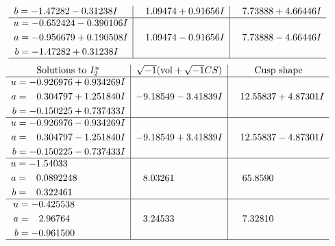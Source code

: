 \documentclass[1p]{elsarticle_modified}
\theoremstyle{definition}
\newcommand{\I}{\sqrt{-1}}
\begin{document}
$$\begin{array}{c|c|c}
\begin{aligned}
b &= -1.47282 - 0.31238 I\end{aligned}
 & \phantom{-}1.09474 + 0.91656 I & \phantom{-}7.73888 + 4.66446 I \\ \hline\begin{aligned}
u &= -0.652424 - 0.390106 I \\
a &= -0.956679 + 0.190508 I \\
b &= -1.47282 + 0.31238 I\end{aligned}
 & \phantom{-}1.09474 - 0.91656 I & \phantom{-}7.73888 - 4.66446 I\\
 \hline 
 \end{array}$$\newpage$$\begin{array}{c|c|c}  
\text{Solutions to }I^u_{2}& \I (\text{vol} + \sqrt{-1}CS) & \text{Cusp shape}\\
 \hline 
\begin{aligned}
u &= -0.926976 + 0.934269 I \\
a &= \phantom{-}0.304797 + 1.251840 I \\
b &= -0.150225 + 0.737433 I\end{aligned}
 & -9.18549 - 3.41839 I & \phantom{-}12.55837 + 4.87301 I \\ \hline\begin{aligned}
u &= -0.926976 - 0.934269 I \\
a &= \phantom{-}0.304797 - 1.251840 I \\
b &= -0.150225 - 0.737433 I\end{aligned}
 & -9.18549 + 3.41839 I & \phantom{-}12.55837 - 4.87301 I \\ \hline\begin{aligned}
u &= -1.54033\phantom{ +0.000000I} \\
a &= \phantom{-}0.0892248\phantom{ +0.000000I} \\
b &= \phantom{-}0.322461\phantom{ +0.000000I}\end{aligned}
 & \phantom{-}8.03261\phantom{ +0.000000I} & \phantom{-}65.8590\phantom{ +0.000000I} \\ \hline\begin{aligned}
u &= -0.425538\phantom{ +0.000000I} \\
a &= \phantom{-}2.96764\phantom{ +0.000000I} \\
b &= -0.961500\phantom{ +0.000000I}\end{aligned}
 & \phantom{-}3.24533\phantom{ +0.000000I} & \phantom{-}7.32810\phantom{ +0.000000I}\\
 \hline 
 \end{array}$$\newpage
\end{document}
